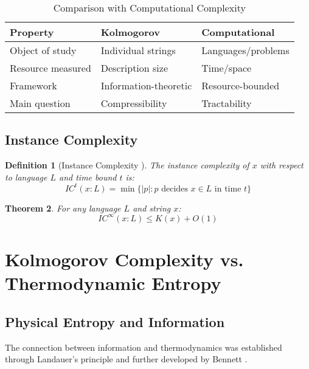 \documentclass[12pt,a4paper]{report}
\newtheorem{theorem}{Theorem}[chapter]
\newtheorem{definition}[theorem]{Definition}
\begin{document}
\begin{table}[h]
\centering
\caption{Comparison with Computational Complexity}
\begin{tabular}{lll}
\toprule
\textbf{Property} & \textbf{Kolmogorov} & \textbf{Computational} \\
\midrule
Object of study & Individual strings & Languages/problems \\
Resource measured & Description size & Time/space \\
Framework & Information-theoretic & Resource-bounded \\
Main question & Compressibility & Tractability \\
\bottomrule
\end{tabular}
\end{table}

\subsection{Instance Complexity}

\begin{definition}[Instance Complexity \cite{orponen1994instance}]
The instance complexity of $x$ with respect to language $L$ and time bound $t$ is:
\begin{equation}
IC^t(x : L) = \min\{|p| : p \text{ decides } x \in L \text{ in time } t\}
\end{equation}
\end{definition}

\begin{theorem}
For any language $L$ and string $x$:
\begin{equation}
IC^{\infty}(x : L) \leq K(x) + O(1)
\end{equation}
\end{theorem}

\section{Kolmogorov Complexity vs. Thermodynamic Entropy}

\subsection{Physical Entropy and Information}

The connection between information and thermodynamics was established through Landauer's principle \cite{landauer1961irreversibility} and further developed by Bennett \cite{bennett1982thermodynamics}.
\end{document}
